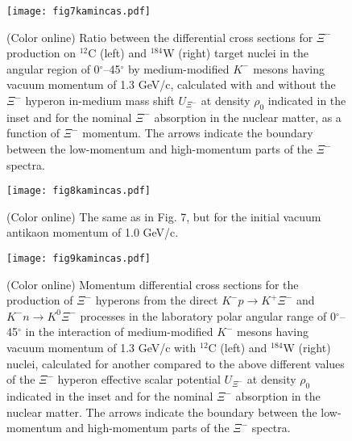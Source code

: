 \documentclass[12pt]{article}
\begin{document}
\begin{figure}[htb]
\begin{center}
\texttt{[image: fig7kamincas.pdf]}
\vspace*{-2mm} \caption{(Color online) Ratio between the differential cross sections for $\Xi^-$
production on $^{12}$C (left) and $^{184}$W (right) target nuclei in the angular region of
0$^{\circ}$--45$^{\circ}$ by medium-modified $K^-$ mesons having vacuum momentum of 1.3 GeV/c,
calculated with and without the $\Xi^-$ hyperon in-medium mass shift
$U_{\Xi^-}$ at density $\rho_0$ indicated in the inset and for the nominal $\Xi^-$ absorption
in the nuclear matter, as a function of $\Xi^-$ momentum.
The arrows indicate the boundary between the low-momentum and high-momentum parts of the
$\Xi^-$ spectra.}
\label{void}
\end{center}
\end{figure}
\begin{figure}[!h]
\begin{center}
\texttt{[image: fig8kamincas.pdf]}
\vspace*{-2mm} \caption{(Color online) The same as in Fig. 7,
but for the initial vacuum antikaon momentum of 1.0 GeV/c.}
\label{void}
\end{center}
\end{figure}
\begin{figure}[!h]
\begin{center}
\texttt{[image: fig9kamincas.pdf]}
\vspace*{-2mm} \caption{(Color online) Momentum differential cross sections for the production of $\Xi^-$
hyperons from the direct ${K^-}p \to {K^+}{\Xi^-}$ and ${K^-}n \to {K^0}{\Xi^-}$
processes in the laboratory polar angular range of
0$^{\circ}$--45$^{\circ}$ in the interaction of medium-modified
$K^-$ mesons having vacuum momentum of 1.3 GeV/c with $^{12}$C
(left) and $^{184}$W (right) nuclei, calculated for another compared to the above
different values of the $\Xi^-$ hyperon effective
scalar potential $U_{\Xi^-}$ at density $\rho_0$ indicated in the inset and
for the nominal $\Xi^-$ absorption in the nuclear matter.
The arrows indicate the boundary between the low-momentum and high-momentum parts of the $\Xi^-$ spectra.}
\label{void}
\end{center}
\end{figure}
\end{document}
